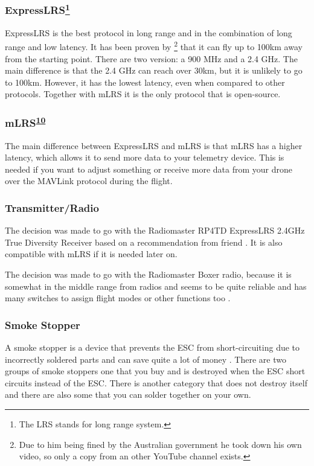 \documentclass[svgnames]{article}
\begin{document}
	\subsubsection*{ExpressLRS\protect\footnote{The LRS stands for long range system.}}
	ExpressLRS is the best protocol in long range and in the combination of long range and low latency. It has been proven by \textcite{elrswezley}\footnote{Due to him being fined by the Australian government he took down his own video, so only a copy from an other YouTube channel exists.} that it can fly up to 100km away from the starting point. There are two version: a 900 MHz and a 2.4 GHz. The main difference is that the 2.4 GHz can reach over 30km, but it is unlikely to go to 100km. However, it has the lowest latency, even when compared to other protocols. Together with mLRS it is the only protocol that is open-source.
	\subsubsection*{mLRS\textsuperscript{\hyperlink{footnote9}{10}}}
	The main difference between ExpressLRS and mLRS is that mLRS has a higher latency, which allows it to send more data to your telemetry device. This is needed if you want to adjust something or receive more data from your drone over the MAVLink protocol during the flight. 
	
	\subsubsection*{Transmitter/Radio}
	The decision was made to go with the Radiomaster RP4TD ExpressLRS 2.4GHz True Diversity Receiver based on a recommendation from friend \cite{radiomasterreceiver}. It is also compatible with mLRS if it is needed later on.
	
	The decision was made to go with the Radiomaster Boxer radio, because it is somewhat in the middle range from radios and seems to be quite reliable and has many switches to assign flight modes or other functions too  \cite{radiomasterboxer}. 

	\subsubsection{Smoke Stopper}
	A smoke stopper is a device that prevents the ESC from short-circuiting due to incorrectly soldered parts and can save quite a lot of money  \cite{smokestopper}. There are two groups of smoke stoppers one that you buy and is destroyed when the ESC short circuits instead of the ESC. There is another category that does not destroy itself and there are also some that you can solder together on your own. 
	
\end{document}
